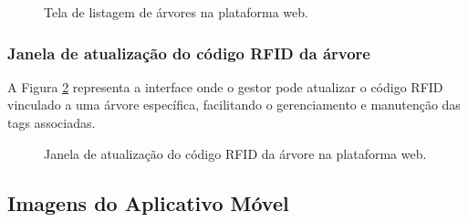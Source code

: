 \begin{figure}[H]
 \centering
 \caption{Tela de listagem de árvores na plataforma web.}
 \label{fig:TreeList}
\end{figure}

\subsubsection{Janela de atualização do código RFID da árvore}
A Figura \ref{fig:UpdateTreeRfid} representa a interface onde o gestor pode atualizar o código RFID vinculado a uma árvore específica, facilitando o gerenciamento e manutenção das tags associadas.

\begin{figure}[htb]
 \centering
 \caption{Janela de atualização do código RFID da árvore na plataforma web.}
 \label{fig:UpdateTreeRfid}
\end{figure}

\subsection{Imagens do Aplicativo Móvel}

